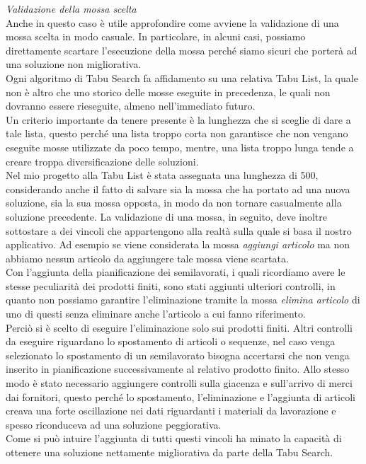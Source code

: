 \textit{Validazione della mossa scelta}\\
Anche in questo caso è utile approfondire come avviene la validazione di una mossa scelta in modo casuale. In particolare, in alcuni casi, possiamo direttamente scartare
l'esecuzione della mossa perché siamo sicuri che porterà ad una soluzione non migliorativa.\\ Ogni algoritmo di Tabu Search fa affidamento su una relativa Tabu List\glo, la quale
non è altro che uno storico delle mosse eseguite in precedenza, le quali non dovranno essere rieseguite, almeno nell'immediato futuro.\\ Un criterio importante da tenere presente
è la lunghezza che si sceglie di dare a tale lista, questo perché una lista troppo corta non garantisce che non vengano eseguite mosse utilizzate da poco tempo, mentre, una 
lista troppo lunga tende a creare troppa diversificazione delle soluzioni.\\ Nel mio progetto alla Tabu List è stata assegnata una lunghezza di 500, considerando anche il fatto
di salvare sia la mossa che ha portato ad una nuova soluzione, sia la sua mossa opposta, in modo da non tornare casualmente alla soluzione precedente. La validazione di una mossa,
in seguito, deve inoltre sottostare a dei vincoli che appartengono alla realtà sulla quale si basa il nostro applicativo. Ad esempio se viene considerata la mossa \textit{aggiungi articolo}
ma non abbiamo nessun articolo da aggiungere tale mossa viene scartata.\\ Con l'aggiunta della pianificazione dei semilavorati, i quali ricordiamo avere le stesse peculiarità
dei prodotti finiti, sono stati aggiunti ulteriori controlli, in quanto non possiamo garantire l'eliminazione tramite la mossa \textit{elimina articolo} di uno di questi senza
eliminare anche l'articolo a cui fanno riferimento.\\ Perciò si è scelto di eseguire l'eliminazione solo sui prodotti finiti. Altri controlli da eseguire riguardano lo spostamento
di articoli o sequenze, nel caso venga selezionato lo spostamento di un semilavorato bisogna accertarsi che non venga inserito in pianificazione successivamente al relativo
prodotto finito. Allo stesso modo è stato necessario aggiungere controlli sulla giacenza e sull'arrivo di merci dai fornitori, questo perché lo spostamento, l'eliminazione e l'aggiunta
di articoli creava una forte oscillazione nei dati riguardanti i materiali da lavorazione e spesso riconduceva ad una soluzione peggiorativa.\\ Come si può intuire l'aggiunta
di tutti questi vincoli ha minato la capacità di ottenere una soluzione nettamente migliorativa da parte della Tabu Search.\\

